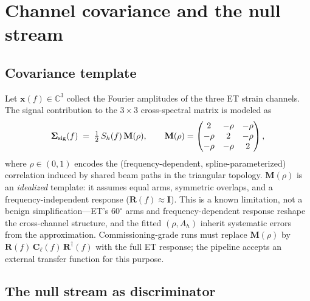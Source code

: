 \documentclass[11pt]{article}
\newcommand{\Ah}{A_h}
\newcommand{\Sh}{S_h}
\begin{document}
\section{Channel covariance and the null stream}
\label{sec:covariance}

\subsection{Covariance template}

Let $\mathbf{x}(f) \in \mathbb{C}^3$ collect the Fourier amplitudes of the three ET strain channels. The signal contribution to the $3\times3$ cross-spectral matrix is modeled as
\begin{equation}
\bm{\Sigma}_{\rm sig}(f) \;=\; \tfrac{1}{2}\,\Sh(f)\, \mathbf{M}(\rho),
\qquad
\mathbf{M}(\rho) = \begin{pmatrix} 2 & -\rho & -\rho \\ -\rho & 2 & -\rho \\ -\rho & -\rho & 2 \end{pmatrix},
\label{eq:template}
\end{equation}
where $\rho \in (0,1)$ encodes the (frequency-dependent, spline-parameterized) correlation induced by shared beam paths in the triangular topology. $\mathbf{M}(\rho)$ is an \emph{idealized} template: it assumes equal arms, symmetric overlaps, and a frequency-independent response ($\mathbf{R}(f) \approx \mathbf{I}$). This is a known limitation, not a benign simplification---ET's $60^\circ$ arms and frequency-dependent response reshape the cross-channel structure, and the fitted $(\rho, \Ah)$ inherit systematic errors from the approximation. Commissioning-grade runs must replace $\mathbf{M}(\rho)$ by $\mathbf{R}(f)\,\mathbf{C}_\ell(f)\,\mathbf{R}^\dagger(f)$ with the full ET response; the pipeline accepts an external transfer function for this purpose.

\subsection{The null stream as discriminator}
\label{sec:nullstream}
\end{document}
